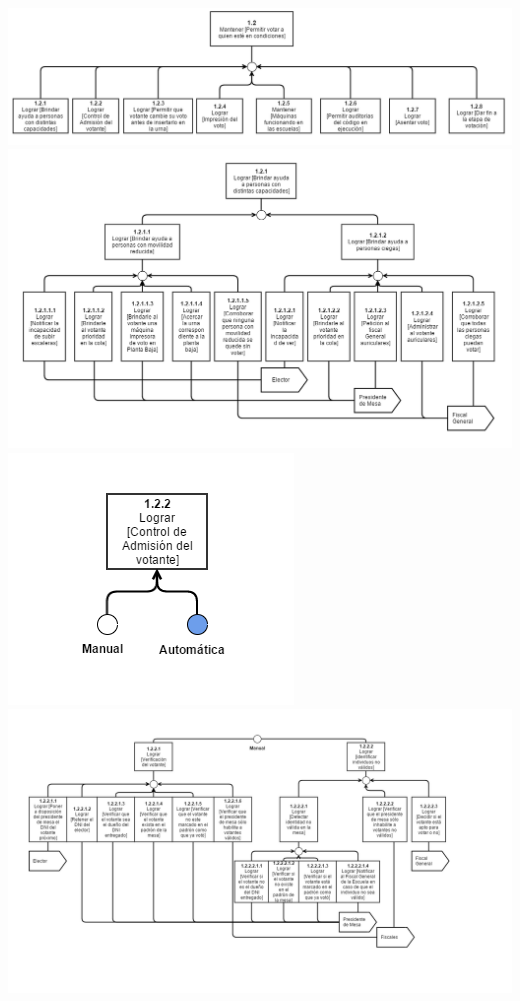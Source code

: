 \includegraphics[scale=0.45]{imagenes/Diagramas/12/12.png}
\\
\includegraphics[scale=0.55]{imagenes/Diagramas/12/121.png}
\\
\includegraphics[scale=0.55]{imagenes/Diagramas/12/122.png}
\\
\includegraphics[scale=0.55]{imagenes/Diagramas/12/122a.png}
